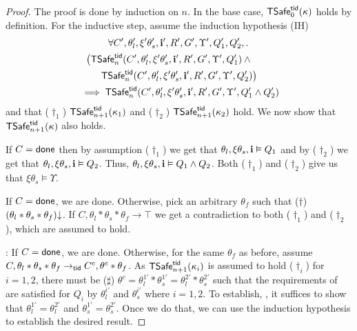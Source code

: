 \begin{proof}
The proof is done by induction on $n$.
In the base case, 
${\sf TSafe}^{{\sf tid}}_0(\kappa)$ holds by definition.
For the inductive step, 
assume 
the induction hypothesis (IH)  
\begin{multline*}
  \forall C',\theta'_l,\xi'\theta'_s,\intp',R',G',\Upsilon', Q_1', Q_2',.\,\\
  \big(%
  \safe_n(C',\theta'_l,\xi'\theta'_s,\intp',R',G',\Upsilon', Q_1') \land \mbox{}\qquad\\
   \safe_n(C',\theta'_l,\xi'\theta'_s,\intp',R',G',\Upsilon', Q_2')\big)\\ 
   \mbox{}\implies  \safe_n(C',\theta'_l,\xi'\theta'_s,\intp',R',G',\Upsilon', Q_1' \land Q'_2)   
\end{multline*}
and that ($\dagger_1$) ${\sf TSafe}^{{\sf tid}}_{n+1}(\kappa_1)$ and ($\dagger_2$) ${\sf TSafe}^{{\sf tid}}_{n+1}(\kappa_2)$  
hold.
We now show that ${\sf TSafe}^{{\sf tid}}_{n+1}(\kappa)$ also holds.


If $C = {\sf done}$ then by assumption ($\dagger_1$) we get that 
$\theta_l,\xi\theta_s,{\bf i} \vDash Q_1$ and by 
($\dagger_2$) we get that 
$\theta_l,\xi\theta_s,{\bf i} \vDash Q_2$.
Thus, $\theta_l,\xi\theta_s,{\bf i} \vDash Q_1 \land Q_2$.
Both ($\dagger_1$) and ($\dagger_2$) give us that $\xi\theta_s \vDash \Upsilon$.


If $C={\sf done}$, we are done.
Otherwise, 
pick an arbitrary $\theta_f$ such that ($\dagger$) $(\theta_l*\theta_s*\theta_f)\mathpunct{\downarrow}$.
If $C,\theta_l*\theta_s*\theta_f \rightarrow \top$   we get a contradiction to both ($\dagger_1$) and ($\dagger_2$),
which are assumed to hold.

: 
If $C={\sf done}$, we are done.
Otherwise, 
for the same $\theta_f$ as before,
assume $C,\theta_l*\theta_s*\theta_f \rightarrow_{{\sf tid}} C^c,\theta^c*\theta_f$. %
As ${\sf TSafe}^{{\sf tid}}_{n+1}(\kappa_i)$ is assumed to hold ($\dag_i$) for $i=1,2$,
there must be 
($\sharp$) $\theta^c =\theta^{1'}_l * \theta^{1'}_s = \theta^{2'}_l * \theta^{2'}_s$
such that %
the requirements of  are satisfied for $Q_i$ by $\theta^{i'}_l$ and $\theta^{i'}_s$ where $i=1,2$. 
To establish, , it suffices to show that 
$\theta^{1'}_l  = \theta^{2'}_l $ and
$\theta^{1'}_s = \theta^{2'}_s$. Once we do that, we can use the induction hypothesis to establish the desired result.


\end{proof}
